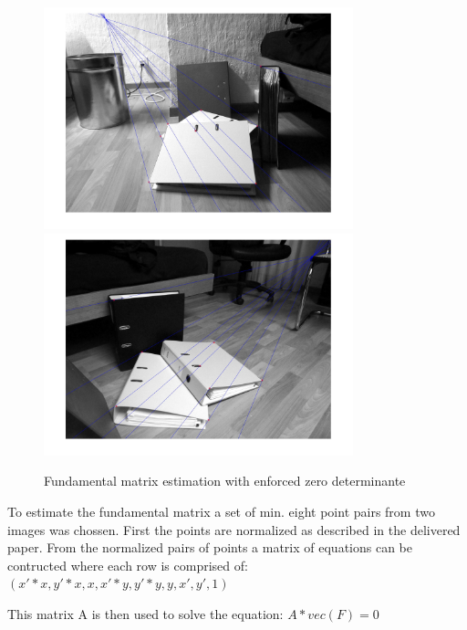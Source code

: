 \documentclass[12pt]{article}
\begin{document}
\newline
\begin{figure}[ht]
	\centering
	\includegraphics[width=0.8\textwidth]{Fh1Book.jpg}
	\includegraphics[width=0.8\textwidth]{Fh2Book.jpg}
	\caption{Fundamental matrix estimation with enforced zero determinante}
	\label{fig1}
\end{figure}
\vspace{5mm}
\newline

To estimate the fundamental matrix a set of min. eight point pairs from two images was chossen. First the points are normalized as described in the delivered paper. 
From the normalized pairs of points a matrix of equations can be contructed where each row is comprised of: 
\vspace{5mm}
\newline
$(x'*x, y'*x, x, x'*y, y'*y, y,x',y',1)$
\vspace{5mm}
\newline

This matrix A is then used to solve the equation:
\vspace{5mm}
\newline
$A*vec(F)=0$
\vspace{5mm}
\newline
\end{document}

